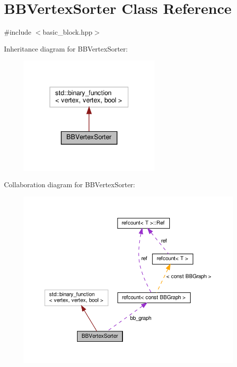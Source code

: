 \hypertarget{classBBVertexSorter}{}\section{B\+B\+Vertex\+Sorter Class Reference}
\label{classBBVertexSorter}


{\ttfamily \#include $<$basic\+\_\+block.\+hpp$>$}



Inheritance diagram for B\+B\+Vertex\+Sorter\+:
\nopagebreak
\begin{figure}[H]
\begin{center}
\leavevmode
\includegraphics[width=199pt]{d5/d7f/classBBVertexSorter__inherit__graph}
\end{center}
\end{figure}


Collaboration diagram for B\+B\+Vertex\+Sorter\+:
\nopagebreak
\begin{figure}[H]
\begin{center}
\leavevmode
\includegraphics[width=350pt]{d1/d49/classBBVertexSorter__coll__graph}
\end{center}
\end{figure}
